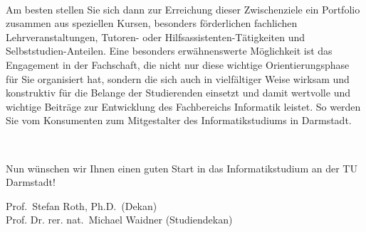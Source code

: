 {    \

    Am besten stellen Sie sich dann zur Erreichung dieser Zwischenziele ein Portfolio zusammen aus speziellen Kursen, besonders förderlichen fachlichen Lehrveranstaltungen, Tutoren- oder Hilfsassistenten-Tätigkeiten und Selbststudien-Anteilen. Eine besonders erwähnenswerte Möglichkeit ist das Engagement in der Fachschaft, die nicht nur diese wichtige Orientierungsphase für Sie organisiert hat, sondern die sich auch in vielfältiger Weise wirksam und konstruktiv für die Belange der Studierenden einsetzt und damit wertvolle und wichtige Beiträge zur Entwicklung des Fachbereichs Informatik leistet. So werden Sie vom Konsumenten zum Mitgestalter des Informatikstudiums in Darmstadt.

    \

    Nun wünschen wir Ihnen einen guten Start in das Informatikstudium an der TU Darmstadt!
}
{Prof.~Stefan Roth, Ph.D.~(Dekan) \\Prof. Dr. rer. nat.~Michael Waidner (Studiendekan)}

\newpage
